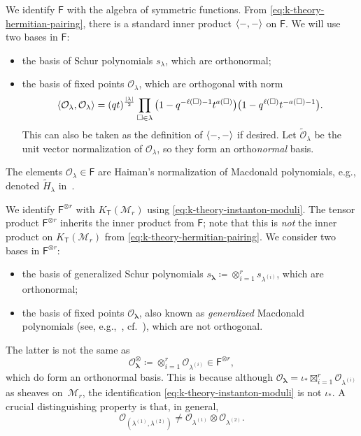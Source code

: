 \documentclass[pdftex]{sigma}%
\numberwithin{equation}{section}
\renewcommand{\vec}[1]{\bm{#1}}
\renewcommand{\tilde}[1]{\widetilde{#1}}
\newcommand{\cM}{\mathcal{M}}
\newcommand{\cO}{\mathcal{O}}
\newcommand{\sF}{\mathsf{F}}
\newcommand{\sT}{\mathsf{T}}
\DeclarePairedDelimiter{\inner}{\langle}{\rangle}
\begin{document}
\begin{MyParagraph}\label{sec:instanton-moduli-bases}
We identify $\sF$ with the algebra of symmetric functions. From
\eqref{eq:k-theory-hermitian-pairing}, there is a standard inner
product $\inner{-, -}$ on $\sF$. We will use two bases in $\sF$:
\begin{itemize}\itemsep=0pt
\item the basis of Schur polynomials $s_\lambda$, which are
 orthonormal;
\item the basis of fixed points $\cO_\lambda$, which are orthogonal
 with norm
 \[ \inner{\cO_\lambda, \cO_\lambda} = (qt)^{\frac{|\lambda|}{2}} \prod_{\square \in \lambda} \big(1 - q^{-\ell(\square)-1} t^{a(\square)}\big) \big(1 - q^{\ell(\square)} t^{-a(\square)-1}\big). \]
 This can also be taken as the definition of $\inner{-, -}$ if
 desired. Let $\tilde\cO_\lambda$ be the unit vector normalization of
 $\cO_\lambda$, so they form an ortho{\it normal} basis.
\end{itemize}
The elements $\cO_\lambda \in \sF$ are Haiman's normalization of
Macdonald polynomials, e.g., denoted $\tilde H_\lambda$ in~\cite{Haiman1999}.
\end{MyParagraph}

\begin{MyParagraph}\label{sec:fixed-point-vs-naive-rank-r-basis}
We identify $\sF^{\otimes r}$ with $K_\sT(\cM_r)$ using
\eqref{eq:k-theory-instanton-moduli}. The tensor product
$\sF^{\otimes r}$ inherits the inner product from $\sF$; note that
this is {\it not} the inner product on $K_\sT(\cM_r)$ from
\eqref{eq:k-theory-hermitian-pairing}. We consider two bases in
$\sF^{\otimes r}$:
\begin{itemize}\itemsep=0pt
\item the basis of generalized Schur polynomials
 $s_{\vec\lambda} \coloneqq \otimes_{i=1}^r s_{\lambda^{(i)}}$, which
 are orthonormal;
\item the basis of fixed points $\cO_{\vec\lambda}$, also known as
 {\it generalized} Macdonald polynomials (see, e.g.,~\cite{Awata2016},
 cf.~\cite{Smirnov2014}), which are not orthogonal.
\end{itemize}
The latter is not the same as
\[ \cO^{\otimes}_{\vec\lambda} \coloneqq \otimes_{i=1}^r \cO_{\lambda^{(i)}} \in \sF^{\otimes r}, \]
which do form an orthonormal basis. This is because although
$\cO_{\vec\lambda} = \iota_* \boxtimes_{i=1}^r \cO_{\lambda^{(i)}}$ as
sheaves on~$\cM_r$, the identification
\eqref{eq:k-theory-instanton-moduli} is not $\iota_*$. A crucial
distinguishing property is that, in general,
\[ \cO_{(\lambda^{(1)}, \lambda^{(2)})} \neq \cO_{\lambda^{(1)}} \otimes \cO_{\lambda^{(2)}}. \]
\end{MyParagraph}
\end{document}

